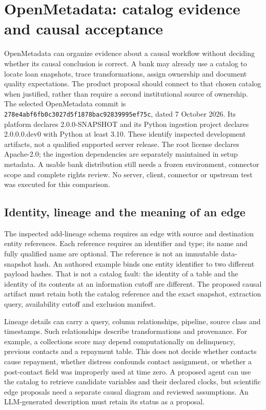 \section{OpenMetadata: catalog evidence and causal acceptance}
\label{sec:exec24-openmetadata}

OpenMetadata can organize evidence about a causal workflow without deciding
whether its causal conclusion is correct. A bank may already use a catalog to
locate loan snapshots, trace transformations, assign ownership and document
quality expectations. The product proposal should connect to that chosen
catalog when justified, rather than require a second institutional source of
ownership. The selected OpenMetadata commit is
\texttt{278e4abf6fb0c3027d5f1878bac92839995ef75c}, dated 7 October 2026.
Its platform declares 2.0.0-SNAPSHOT and its Python ingestion project declares
2.0.0.0.dev0 with Python at least 3.10. These identify inspected development
artifacts, not a qualified supported server release. The root license declares
Apache-2.0; the ingestion dependencies are separately maintained in setup
metadata. A usable bank distribution still needs a frozen environment, connector
scope and complete rights review. No server, client, connector or upstream test
was executed for this comparison.\citep{exec24_openmetadata_source}

\subsection{Identity, lineage and the meaning of an edge}

The inspected add-lineage schema requires an edge with source and destination
entity references. Each reference requires an identifier and type; its name and
fully qualified name are optional. The reference is not an immutable data-snapshot
hash. An authored example binds one entity identifier to two different payload
hashes. That is not a catalog fault: the identity of a table and the identity of
its contents at an information cutoff are different. The proposed causal artifact
must retain both the catalog reference and the exact snapshot, extraction
query, availability cutoff and exclusion manifest.\citep{exec24_openmetadata_source,exec24_openmetadata_reference}

Lineage details can carry a query, column relationships, pipeline, source class
and timestamps. Such relationships describe transformations and provenance.
For example, a collections score may depend computationally on delinquency,
previous contacts and a repayment table. This does not decide whether contacts
cause repayment, whether distress confounds contact assignment, or whether a
post-contact field was improperly used at time zero. A proposed agent can use
the catalog to retrieve candidate variables and their declared clocks, but
scientific edge proposals need a separate causal diagram and reviewed assumptions.
An LLM-generated description must retain its status as a proposal.
\citep{exec24_openmetadata_source}

